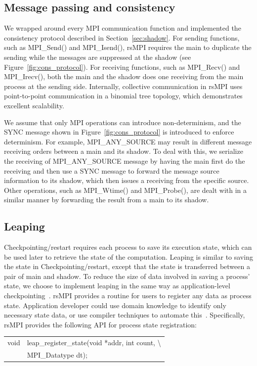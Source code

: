 \subsection{Message passing and consistency}
We wrapped around every MPI communication function and implemented the consistency protocol described in Section~\ref{sec:shadow}. For sending functions, such as MPI\_Send() and MPI\_Isend(), rsMPI requires the main to duplicate the sending while the messages are suppressed at the shadow (see Figure~\ref{fig:cons_protocol}). For receiving functions, such as MPI\_Recv() and MPI\_Irecv(), both the main and the shadow does one receiving from the main process at the sending side. Internally, collective communication in rsMPI uses point-to-point communication in a binomial tree topology, which demonstrates excellent scalability.

We assume that only MPI operations can introduce non-determinism, and the SYNC message shown in Figure~\ref{fig:cons_protocol} is introduced to enforce determinism. For example, MPI\_ANY\_SOURCE may result in different message receiving orders between a main and its shadow. To deal with this, we serialize the receiving of MPI\_ANY\_SOURCE message by having the main first do the receiving and then use a SYNC message to forward the message source information to its shadow, which then issues a receiving from the specific source. Other operations, such as MPI\_Wtime() and MPI\_Probe(), are dealt with in a similar manner by forwarding the result from a main to its shadow.


\subsection{Leaping}
Checkpointing/restart requires each process to save its execution state, which can be used later to retrieve the state of the computation. Leaping is similar to saving the state in Checkpointing/restart, except that the state is transferred between a pair of main and shadow. 
To reduce the size of data involved in saving a process' state, we choose to implement leaping in the same way as application-level checkpointing~\cite{Beguelin97applicationlevel}. rsMPI provides a routine for users to register any data as process state. Application developer could use domain knowledge to identify only necessary state data, or use compiler techniques to automate this~\cite{5160999}. 
Specifically, rsMPI provides the following API for process state registration:

\begin{tabular}{ l l}
void & leap\_register\_state(void *addr, int count, \textbackslash \\
& MPI\_Datatype dt);
\end{tabular}

